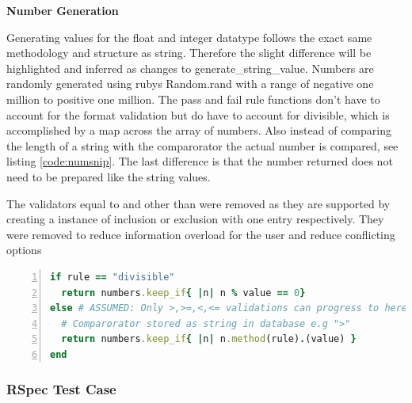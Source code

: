 \documentclass[a4paper,12pt]{article}
\begin{document}
\par \textbf{Number Generation}
\par Generating values for the float and integer datatype follows the exact same methodology and structure as string. Therefore the slight difference will be highlighted and inferred as changes to generate\_string\_value. Numbers are randomly generated using rubys Random.rand with a range of negative one million to positive one million. The pass and fail rule functions don't have to account for the format validation but do have to account for divisible, which is accomplished by a map across the array of numbers. Also instead of comparing the length of a string with the comparorator the actual number is compared, see listing \ref{code:numsnip}. The last difference is that the number returned does not need to be prepared like the string values.
\vspace{3mm}
\par The validators equal to and other than were removed as they are supported by creating a instance of inclusion or exclusion with one entry respectively. They were removed to reduce information overload for the user and reduce conflicting options

\begin{lstlisting}[frame=single,numbers=left,language = ruby,caption= {Difference in pass/fail num rule to string pass/fail}, label={code:numsnip}]
if rule == "divisible"
  return numbers.keep_if{ |n| n % value == 0}
else # ASSUMED: Only >,>=,<,<= validations can progress to here
  # Comparorator stored as string in database e.g ">"
  return numbers.keep_if{ |n| n.method(rule).(value) }
end
\end{lstlisting}
\subsubsection{RSpec Test Case}
\end{document}

